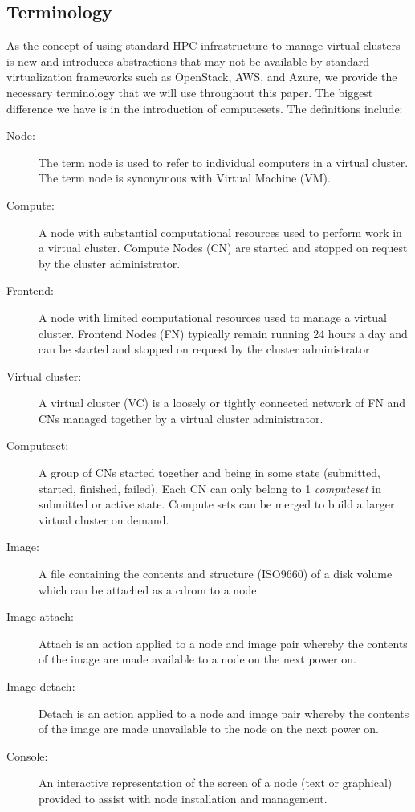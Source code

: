 
\subsection{Terminology}\label{S:terminology}

As the concept of using standard HPC infrastructure to manage virtual
clusters is new and introduces abstractions that may not be available
by standard virtualization frameworks such as OpenStack, AWS, and
Azure, we provide the necessary terminology that we will use
throughout this paper. The biggest difference we have is in the
introduction of computesets. The definitions include:

\begin{description}

\item[Node:] The term node is used to refer to individual computers in a virtual
cluster. The term node is synonymous with Virtual Machine (VM).

\item[Compute:] A node with substantial computational resources used to perform
work in a virtual cluster. Compute Nodes (CN) are started and stopped on request
by the cluster administrator.

\item[Frontend:] A node with limited computational resources used to manage a
virtual cluster. Frontend Nodes (FN) typically remain running 24 hours a day
and can be started and stopped on request by the cluster administrator

\item[Virtual cluster:] A virtual cluster (VC) is a loosely or tightly connected
network of FN and CNs managed together by a virtual cluster administrator.

\item[Computeset:] A group of CNs started together and being in some state
(submitted, started, finished, failed). Each CN can only belong to 1 {\em
computeset\/} in submitted or active state. Compute sets can be merged
to build a larger virtual cluster on demand.

\item[Image:] A file containing the contents and structure (ISO9660) of a disk
volume which can be attached as a cdrom to a node.

\item[Image attach:] Attach is an action applied to a node and image pair
whereby the contents of the image are made available to a node on the next power
on.

\item[Image detach:] Detach is an action applied to a node and image pair
whereby the contents of the image are made unavailable to the node on the next
power on.

\item[Console:] An interactive representation of the screen of a node (text or
graphical) provided to assist with node installation and management.

\end{description}
